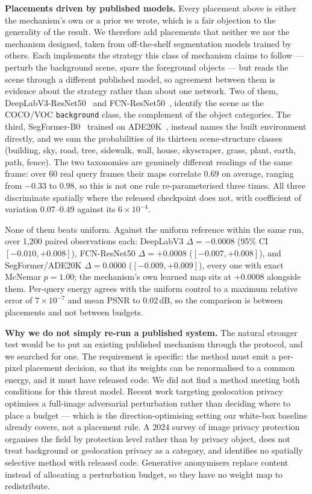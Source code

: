 \documentclass[10pt,journal]{IEEEtran}
\begin{document}
\textbf{Placements driven by published models.} Every placement above is
either the mechanism's own or a prior we wrote, which is a fair objection to
the generality of the result. We therefore add placements that neither we nor
the mechanism designed, taken from off-the-shelf segmentation models trained
by others. Each implements the strategy this class of mechanism claims to
follow --- perturb the background scene, spare the foreground objects --- but
reads the scene through a different published model, so agreement between them
is evidence about the strategy rather than about one network. Two of them,
DeepLabV3-ResNet50~\cite{chen2017rethinking} and
FCN-ResNet50~\cite{long2015fully}, identify the scene as the COCO/VOC
\texttt{background} class, the complement of the object categories. The third,
SegFormer-B0~\cite{xie2021segformer} trained on ADE20K~\cite{zhou2017scene},
instead names the built environment directly,
and we sum the probabilities of its thirteen scene-structure classes
(building, sky, road, tree, sidewalk, wall, house, skyscraper, grass, plant,
earth, path, fence). The two taxonomies are genuinely different readings of
the same frame: over 60 real query frames their maps correlate $0.69$ on
average, ranging from $-0.33$ to $0.98$, so this is not one rule
re-parameterised three times. All three
discriminate spatially where the released checkpoint does not, with
coefficient of variation $0.07$--$0.49$ against its $6\times10^{-4}$.

None of them beats uniform. Against the uniform reference within the same run,
over 1,200 paired observations each: DeepLabV3 $\Delta=-0.0008$ (95\% CI
$[-0.010, +0.008]$), FCN-ResNet50 $\Delta=+0.0008$ ($[-0.007, +0.008]$), and
SegFormer/ADE20K $\Delta=0.0000$ ($[-0.009, +0.009]$), every one with exact
McNemar $p=1.00$; the mechanism's own learned map sits at $+0.0008$ alongside
them. Per-query energy agrees with the uniform control to a maximum relative
error of $7\times10^{-7}$ and mean PSNR to $0.02$\,dB, so the comparison is
between placements and not between budgets.

\textbf{Why we do not simply re-run a published system.} The natural stronger
test would be to put an existing published mechanism through the protocol, and
we searched for one. The requirement is specific: the method must emit a
per-pixel placement decision, so that its weights can be renormalised to a
common energy, and it must have released code. We did not find a method
meeting both conditions for this threat model. Recent work targeting
geolocation privacy optimises a full-image adversarial perturbation rather
than deciding where to place a budget --- which is the direction-optimising
setting our white-box baseline already covers, not a placement rule. A 2024
survey of image privacy protection organises the field by protection level
rather than by privacy object, does not treat background or geolocation
privacy as a category, and identifies no spatially selective method with
released code. Generative anonymisers replace content instead of allocating a
perturbation budget, so they have no weight map to redistribute.
\end{document}
